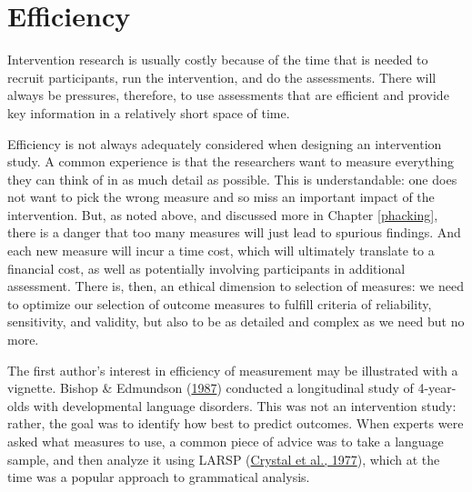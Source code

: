 \documentclass{krantz}
\begin{document}
\hypertarget{efficiency}{%
\section{Efficiency}\label{efficiency}}

Intervention research is usually costly because of the time that is needed to recruit participants, run the intervention, and do the assessments. There will always be pressures, therefore, to use assessments that are efficient and provide key information in a relatively short space of time.

Efficiency is not always adequately considered when designing an intervention study. A common experience is that the researchers want to measure everything they can think of in as much detail as possible. This is understandable: one does not want to pick the wrong measure and so miss an important impact of the intervention. But, as noted above, and discussed more in Chapter \ref{phacking}, there is a danger that too many measures will just lead to spurious findings. And each new measure will incur a time cost, which will ultimately translate to a financial cost, as well as potentially involving participants in additional assessment. There is, then, an ethical dimension to selection of measures: we need to optimize our selection of outcome measures to fulfill criteria of reliability, sensitivity, and validity, but also to be as detailed and complex as we need but no more.

The first author's interest in efficiency of measurement may be illustrated with a vignette. Bishop \& Edmundson (\protect\hyperlink{ref-bishop1987}{1987}) conducted a longitudinal study of 4-year-olds with developmental language disorders. This was not an intervention study: rather, the goal was to identify how best to predict outcomes. When experts were asked what measures to use, a common piece of advice was to take a language sample, and then analyze it using LARSP (\protect\hyperlink{ref-crystal1977}{Crystal et al., 1977}), which at the time was a popular approach to grammatical analysis.
\end{document}
